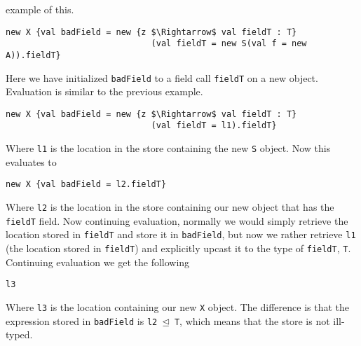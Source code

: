 \documentclass{llncs}
\numberwithin{subcase}{casethm}
\numberwithin{casethm}{theorem}
\numberwithin{casethm}{lemma}
\begin{document}
example of this.
\begin{lstlisting}[mathescape, style=custom_lang]
new X {val badField = new {z $\Rightarrow$ val fieldT : T}
                             (val fieldT = new S(val f = new A)).fieldT}
\end{lstlisting}
Here we have initialized \texttt{badField} to a 
field call \texttt{fieldT} on a new object. 
Evaluation is similar to the previous example.
\begin{lstlisting}[mathescape, style=custom_lang]
new X {val badField = new {z $\Rightarrow$ val fieldT : T}
                             (val fieldT = l1).fieldT}
\end{lstlisting}
Where \texttt{l1} is the location in the store containing the 
new \texttt{S} object. Now this evaluates to
\begin{lstlisting}[mathescape, style=custom_lang]
new X {val badField = l2.fieldT}
\end{lstlisting}
Where \texttt{l2} is the location in the store 
containing our new object that has the \texttt{fieldT} 
field. Now continuing evaluation, normally we would simply 
retrieve the location stored in \texttt{fieldT} and store
it in \texttt{badField}, but now we rather retrieve 
\texttt{l1} (the location stored in \texttt{fieldT}) 
and explicitly upcast it to the type of \texttt{fieldT}, 
\texttt{T}. Continuing evaluation we get the following 
\begin{lstlisting}[mathescape, style=custom_lang]
l3
\end{lstlisting}
Where \texttt{l3} is the location containing our new
\texttt{X} object. The difference is that the expression 
stored in \texttt{badField} is \texttt{l2 $\unlhd$ T}, 
which means that the store is not ill-typed.





\end{document}
